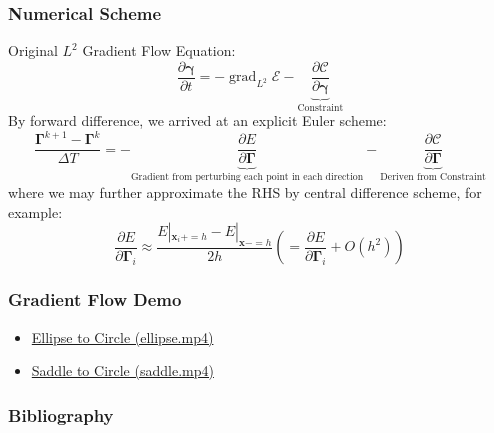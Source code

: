 \documentclass{beamer}
\theoremstyle{remark}
\newcommand{\gammabf}{\boldsymbol{\gamma}}
\newcommand{\Gammabf}{\boldsymbol{\Gamma}}
\newcommand{\xbf}{\mathbf{x}}
\DeclareMathOperator{\grad}{grad}
\begin{document}
\begin{frame}
    \frametitle{Numerical Scheme}
    Original $L^2$ Gradient Flow Equation:
    \begin{equation}
        \frac{\partial \gammabf}{\partial t} = - \grad_{L^2} \mathcal{E} - \underbrace{\frac{\partial \mathcal{C}}{\partial \gammabf}}_{\text{Constraint}}
    \end{equation}
    By forward difference, we arrived at an explicit Euler scheme:
    \begin{equation*}
        \frac{\Gammabf^{k+1} - \Gammabf^k}{\Delta T} = - \underbrace{\frac{\partial E}{\partial \Gammabf}}_{\text{Gradient from perturbing each point in each direction}}
        - \underbrace{\frac{\partial \mathcal{C}}{\partial \Gammabf}}_{\text{Deriven from Constraint}}
    \end{equation*}
    where we may further approximate the RHS by central difference scheme, for example:
    \begin{equation*}
        \frac{\partial E}{\partial \Gammabf_i} \approx \frac{E|_{\xbf_i += h} - E|_{\xbf -= h}}{2h} \left(= \frac{\partial E}{\partial \Gammabf_i} + O(h^2) \right) 
    \end{equation*}
\end{frame}

\begin{frame}
    \frametitle{Gradient Flow Demo}
    \begin{itemize}
        \item \href{run:./demos/ellipse.mp4}{Ellipse to Circle (ellipse.mp4)}
        \item \href{run:./demos/saddle.mp4}{Saddle to Circle (saddle.mp4)}
    \end{itemize}
\end{frame}

\begin{frame}
    \frametitle{Bibliography}
    \printbibliography
\end{frame}
\end{document}
